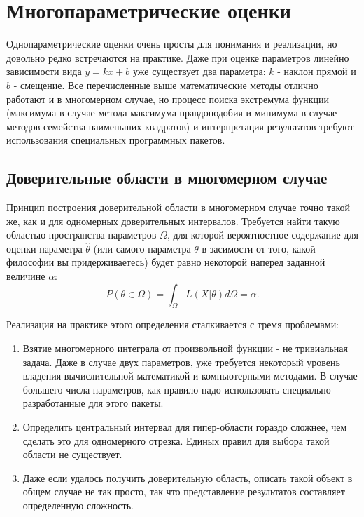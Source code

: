 


\section{Многопараметрические оценки}

    Однопараметрические оценки очень просты для понимания и реализации, но
довольно редко встречаются на практике. Даже при оценке параметров
линейно зависимости вида $y = k x + b$ уже существует два параметра:
$k$ - наклон прямой и $b$ - смещение. Все перечисленные выше
математические методы отлично работают и в многомерном случае, но
процесс поиска экстремума функции (максимума в случае метода максимума
правдоподобия и минимума в случае методов семейства наименьших
квадратов) и интерпретация результатов требуют использования специальных
программных пакетов.

    
\subsection{Доверительные области в многомерном случае}

    Принцип построения доверительной области в многомерном случае точно
такой же, как и для одномерных доверительных интервалов. Требуется найти
такую областью пространства параметров $\Omega$, для которой
вероятностное содержание для оценки параметра $\hat \theta$ (или
самого параметра $\theta$ в засимости от того, какой философии вы
придерживаетесь) будет равно некоторой наперед заданной величине
$\alpha$: \begin{equation}
  P(\theta \in \Omega) = \int_\Omega{L(X | \theta)}d\Omega = \alpha.
\end{equation}

Реализация на практике этого определения сталкивается с тремя
проблемами:

\begin{enumerate}
\item Взятие многомерного интеграла от произвольной функции - не тривиальная
  задача. Даже в случае двух параметров, уже требуется некоторый уровень
  владения вычислительной математикой и компьютерными методами. В случае
  большего числа параметров, как правило надо использовать специально
  разработанные для этого пакеты.
\item Определить центральный интервал для гипер-области гораздо сложнее, чем
  сделать это для одномерного отрезка. Единых правил для выбора такой
  области не существует.
\item Даже если удалось получить доверительную область, описать такой объект
  в общем случае не так просто, так что представление результатов
  составляет определенную сложность.
\end{enumerate}

